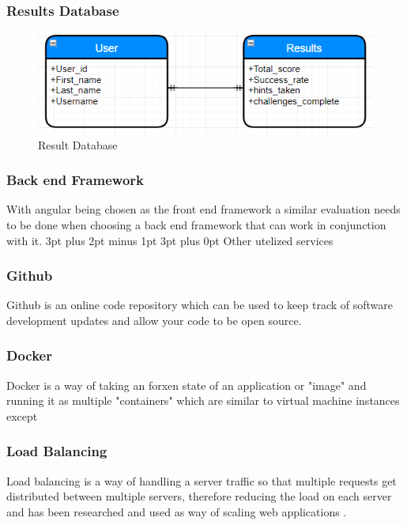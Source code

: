 \documentclass[12pt,a4paper]{article}
\makeatletter
\renewcommand\subsection{\@startsection {subsection}{1}{2mm} %
                               {3pt plus 2pt minus 1pt} %
                               {3pt plus 0pt} %
                               {\normalfont\bfseries}}
\makeatother
\begin{document}
\subsubsection{Results Database}  

\begin{figure}[h]
    \centering
    \includegraphics[width=1.0\textwidth]{Result_Db.PNG} 
    \caption{Result Database}
\end{figure} 

\subsubsection{Back end Framework} 
With angular being chosen as the front end framework a similar evaluation needs to be done when choosing a back end framework that can work in conjunction with it.
\subsection{Other utelized services} 
\subsubsection{Github}  
Github is an online code repository which can be used to keep track of software development updates and allow your code to be open source. 
\subsubsection{Docker}  
Docker is a way of taking an forxen state of an application or "image" and running it as multiple "containers" which are similar to virtual machine instances except  
\subsubsection{Load Balancing} 
Load balancing is a way of handling a server traffic so that multiple requests get distributed between multiple servers, therefore reducing the load on each server and has been researched and used as way of scaling web applications \cite{chieu2009dynamic}.
\end{document}
